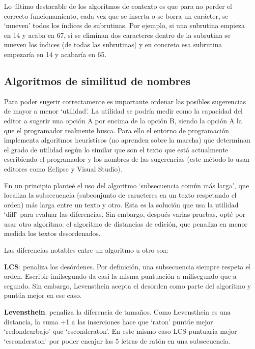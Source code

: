 \documentclass{report}
\begin{document}
	Lo último destacable de los algoritmos de contexto es que para no perder el correcto funcionamiento, cada vez que se inserta o se borra un carácter, se `mueven' todos los índices de subrutinas. Por ejemplo, si una subrutina empieza en 14 y acaba en 67, si se eliminan dos caracteres dentro de la subrutina se mueven los índices (de todas las subrutinas) y en concreto esa subrutina empezaría en 14 y acabaría en 65.
			
	\subsection{Algoritmos de similitud de nombres}
	
	Para poder sugerir correctamente es importante ordenar las posibles sugerencias de mayor a menor `utilidad'. La utilidad se podría medir como la capacidad del editor a sugerir una opción A por encima de la opción B, siendo la opción A la que el programador realmente busca. Para ello el entorno de programación implementa algoritmos heurísticos (no aprenden sobre la marcha) que determinan el grado de utilidad según lo similar que son el texto que está actualmente escribiendo el programador y los nombres de las sugerencias (este método lo usan editores como Eclipse y Visual Studio).
	
	\vspace{10px}
	
	En un principio planteé el uso del algoritmo `subsecuencia común más larga'\cite{lcs}, que localiza la subsecuencia (subconjunto de caracteres en un texto respetando el orden) más larga entre un texto y otro. Esta es la solución que usa la utilidad `diff'\cite{diff} para evaluar las diferencias. Sin embargo, después varias pruebas, opté por usar otro algoritmo: el algoritmo de distancias de edición\cite{levensthein}, que penaliza en menor medida los textos desordenados.
	
	\vspace{10px}
	
	Las diferencias notables entre un algoritmo u otro son:
	
	\vspace{10px}
	
	\noindent
	\textbf{LCS}: penaliza los desórdenes. Por definición, una subsecuencia siempre respeta el orden. Escribir imilsegundo da casi la misma puntuación a milisegundo que a segundo. Sin embargo, Levensthein acepta el desorden como parte del algoritmo y puntúa mejor en ese caso.
	
	\vspace{10px}
	\noindent
	\textbf{Levensthein}: penaliza la diferencia de tamaños. Como Levensthein es una distancia, la suma +1 a las inserciones hace que `raton' puntúe mejor `redondearbajo' que `esconderaton'. En este mismo caso LCS puntuaría mejor `esconderaton' por poder encajar las 5 letras de ratón en una subsecuencia.
	
\end{document}
